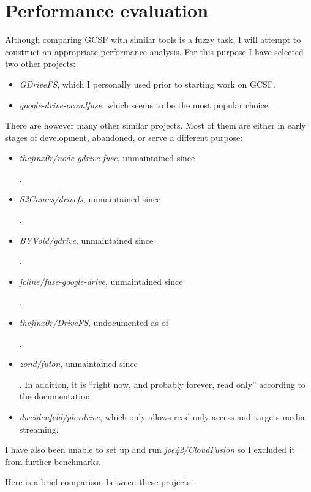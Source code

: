 \chapter{Performance evaluation}

Although comparing GCSF with similar tools is a fuzzy task, I will attempt to construct an appropriate performance analysis. For this purpose I have selected two other projects:

\begin{itemize}
  \itemsep0em
  \item \emph{GDriveFS}, which I personally used prior to starting work on GCSF.
  \item \emph{google-drive-ocamlfuse}, which seems to be the most popular choice.
\end{itemize}

There are however many other similar projects. Most of them are either in early stages of development, abandoned, or serve a different purpose:

\begin{itemize}
  \itemsep0em
  \item \emph{thejinx0r/node-gdrive-fuse}, unmaintained since \date{February 2016}.
  \item \emph{S2Games/drivefs}, unmaintained since \date{June 2014}.
  \item \emph{BYVoid/gdrive}, unmaintained since \date{October 2013}.
  \item \emph{jcline/fuse-google-drive}, unmaintained since \date{September 2012}.
  \item \emph{thejinx0r/DriveFS}, undocumented as of \date{June 2018}.
  \item \emph{zond/futon}, unmaintained since \date{December 2014}. In addition, it is ``right now, and probably forever, read only'' according to the documentation.
  \item \emph{dweidenfeld/plexdrive}, which only allows read-only access and targets media streaming.
\end{itemize}

I have also been unable to set up and run \emph{joe42/CloudFusion} so I excluded it from further benchmarks.


Here is a brief comparison between these projects:

